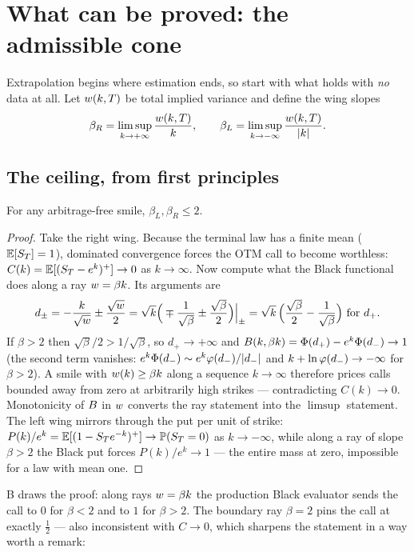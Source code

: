 \documentclass[11pt]{article}
\newcommand{\bL}{\beta_L}
\newcommand{\bR}{\beta_R}
\begin{document}
\section{What can be proved: the admissible cone}
\label{sec:prove}

Extrapolation begins where estimation ends, so start with what holds
with \emph{no} data at all.  Let $w(k,T)$ be total implied variance
and define the wing slopes
\[
\bR=\limsup_{k\to+\infty}\frac{\tvar(k,T)}{k},\qquad
\bL=\limsup_{k\to-\infty}\frac{\tvar(k,T)}{|k|} .
\]

\subsection{The ceiling, from first principles}

\begin{proposition}
\label{prop:ceiling}
For any arbitrage-free smile, $\bL,\bR\le2$.
\end{proposition}

\begin{proof}
Take the right wing.  Because the terminal law has a finite mean
($\mathbb{E}[S_T]=1$), dominated convergence forces the OTM call to become
worthless: $C(k)=\mathbb{E}[(S_T-e^{k})^{+}]\to0$ as $k\to\infty$.  Now compute
what the Black functional does along a ray $w=\beta k$.  Its
arguments are
\[
d_{\pm}=-\frac{k}{\sqrt{w}}\pm\frac{\sqrt{w}}{2}
=\sqrt{k}\Big(\mp\frac{1}{\sqrt\beta}\pm\frac{\sqrt\beta}{2}\Big)
\Big|_{\pm}
=\sqrt{k}\,\Big(\frac{\sqrt\beta}{2}-\frac{1}{\sqrt\beta}\Big)
\ \text{for } d_{+}.
\]
If $\beta>2$ then $\sqrt\beta/2>1/\sqrt\beta$, so $d_{+}\to+\infty$ and
$B(k,\beta k)=\Phi(d_{+})-e^{k}\Phi(d_{-})\to1$ (the second term
vanishes: $e^{k}\Phi(d_{-})\sim e^{k}\varphi(d_{-})/|d_{-}|$ and
$k+\ln\varphi(d_{-})\to-\infty$ for $\beta>2$).  A smile with
$w(k)\ge\beta k$ along a sequence $k\to\infty$ therefore prices
calls bounded away from zero at arbitrarily high strikes ---
contradicting $C(k)\to0$.  Monotonicity of $B$ in $w$ converts
the ray statement into the $\limsup$ statement.  The left wing mirrors
through the put per unit of strike: $P(k)/e^{k}=\mathbb{E}[(1-S_T e^{-k})^{+}]
\to\mathbb{P}(S_T=0)$ as $k\to-\infty$, while along a ray of slope
$\beta>2$ the Black put forces $P(k)/e^{k}\to1$ --- the entire mass at
zero, impossible for a law with mean one.
\end{proof}

B draws the proof: along rays $w=\beta k$ the
production Black evaluator sends the call to $0$ for $\beta<2$ and to
$1$ for $\beta>2$.  The boundary ray $\beta=2$ pins the call at exactly
$\tfrac12$ --- also inconsistent with $C\to0$, which sharpens the
statement in a way worth a remark:
\end{document}
